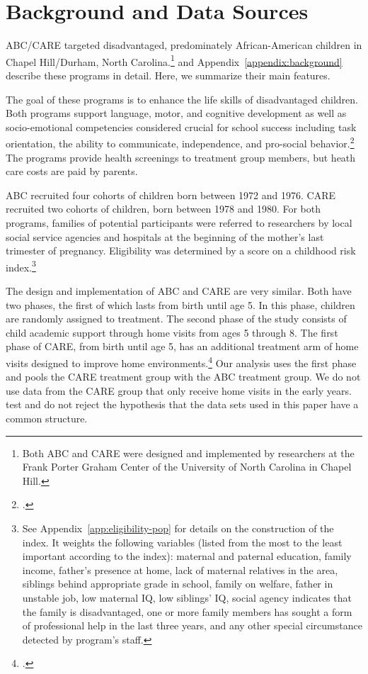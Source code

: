 \section[Background and Data Sources]{Background and Data Sources} \label{section:background}

ABC/CARE targeted disadvantaged, predominately African-American children in Chapel Hill/Durham, North Carolina.\footnote{Both ABC and CARE were designed and implemented by researchers at the Frank Porter Graham Center of the University of North Carolina in Chapel Hill.} \cite{Garcia_Heckman_Ziff_2017_Gender-Diff_UNPUBLISHED} and  Appendix~\ref{appendix:background} describe these programs in detail. Here, we summarize their main features.

The goal of these programs is to enhance the life skills of disadvantaged children. Both programs support language, motor, and cognitive development as well as socio-emotional competencies considered crucial for school success including task orientation, the ability to communicate, independence, and pro-social behavior.\footnote{\citet{Sparling_1974_Synth_Edu_Infant_SPEECH, Ramey_Collier_etal_1976_CarolinaAbecedarianProject, Ramey_etal_1985_Project-CARE_TiECSE, Wasik_Ramey_etal_1990_CD, Ramey-etal_2012-ABC}.} The programs provide health screenings to treatment group members, but heath care costs are paid by parents.

ABC recruited four cohorts of children born between 1972 and 1976. CARE recruited two cohorts of children, born between 1978 and 1980. For both programs, families of potential participants were referred to researchers by local social service agencies and hospitals at the beginning of the mother's last trimester of pregnancy. Eligibility was determined by a score on a childhood risk index.\footnote{See  Appendix~\ref{app:eligibility-pop} for details on the construction of the index. It weights the following variables (listed from the most to the least important according to the index): maternal and paternal education, family income, father's presence at home, lack of maternal relatives in the area, siblings behind appropriate grade in school, family on welfare, father in unstable job, low maternal IQ, low siblings' IQ, social agency indicates that the family is disadvantaged, one or more family members has sought a form of professional help in the last three years, and any other special circumstance detected by program's staff.}

The design and implementation of ABC and CARE are very similar. Both have two phases, the first of which lasts from birth until age 5. In this phase, children are randomly assigned to treatment. The second phase of the study consists of child academic support through home visits from ages 5 through 8. The first phase of CARE, from birth until age 5, has an additional treatment arm of home visits designed to improve home environments.\footnote{\citet{Wasik_Ramey_etal_1990_CD}.} Our analysis uses the first phase and pools the CARE treatment group with the ABC treatment group. We do not use data from the CARE group that only receive home visits in the early years. \cite{Campbell_Conti_etal_2014_EarlyChildhoodInvestments} test and do not reject the hypothesis that the data sets used in this paper have a common structure.

